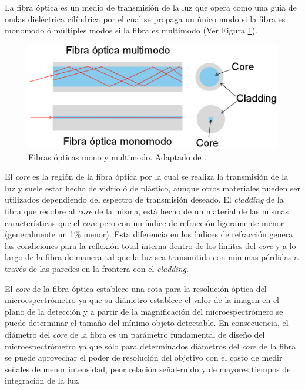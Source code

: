 La fibra óptica es un medio de transmisión de la luz que opera como una guía de ondas dieléctrica cilíndrica por el cual se propaga un único modo si la fibra es monomodo ó múltiples modos si la fibra es multimodo (Ver Figura \ref{fig:guiasmon}). 
\begin{figure}
	\centering
	\includegraphics[width=1.0\textwidth]{Figs/introduccion/guias.png}
	\caption{Fibras ópticas mono y multimodo. Adaptado de \cite{dintek}.}
	\label{fig:guiasmon}
\end{figure}
El \textit{core} es la región de la fibra óptica por la cual se realiza la transmisión de la luz y suele estar hecho de vidrio ó de plástico, aunque otros materiales pueden ser utilizados dependiendo del espectro de transmisión deseado. El \textit{cladding} de la fibra que recubre al \textit{core} de la misma, está hecho de un material de las mismas características que el \textit{core} pero con un índice de refracción ligeramente menor (generalmente un 1\% menor)\cite{hecht2012optics}. Esta diferencia en los índices de refracción genera las condiciones para la reflexión total interna dentro de los límites del \textit{core} y a lo largo de la fibra de manera tal que la luz sea transmitida con mínimas pérdidas a través de las paredes en la frontera con el \textit{cladding}. 

El \textit{core} de la fibra óptica establece una cota para la resolución óptica del microespectrómetro ya que su diámetro establece el valor de la imagen en el plano de la detección y a partir de la magnificación del microespectrómero se puede determinar el tamaño del mínimo objeto detectable. En consecuencia, el diámetro del \textit{core} de la fibra es un parámetro fundamental de diseño del microespectrómetro ya que sólo para determinados diámetros del \textit{core} de la fibra se puede aprovechar el poder de resolución del objetivo con el costo de medir señales de menor intensidad, peor relación señal-ruido y de mayores tiempos de integración de la luz.


